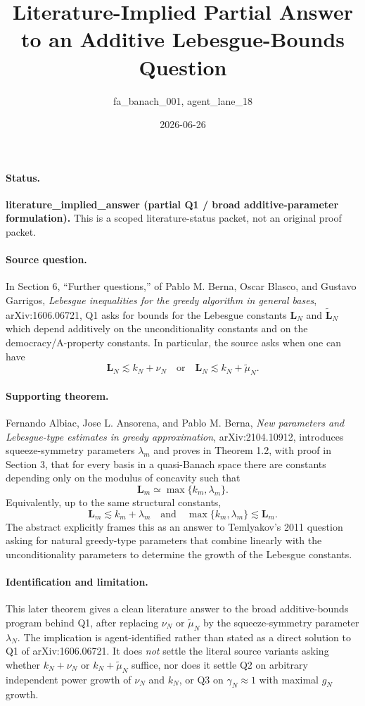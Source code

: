 \documentclass[11pt]{article}
\title{Literature-Implied Partial Answer to an Additive Lebesgue-Bounds Question}
\author{fa\_banach\_001, agent\_lane\_18}
\date{2026-06-26}
\begin{document}
\maketitle

\paragraph{Status.}
\textbf{literature\_implied\_answer (partial Q1 / broad additive-parameter formulation).}
This is a scoped literature-status packet, not an original proof packet.

\paragraph{Source question.}
In Section 6, ``Further questions,'' of Pablo M. Berna, Oscar Blasco, and Gustavo Garrigos,
\emph{Lebesgue inequalities for the greedy algorithm in general bases}, arXiv:1606.06721,
Q1 asks for bounds for the Lebesgue constants $\mathbf L_N$ and $\widetilde{\mathbf L}_N$
which depend additively on the unconditionality constants and on the democracy/A-property
constants.  In particular, the source asks when one can have
\[
  \mathbf L_N \lesssim k_N+\nu_N
  \quad\text{or}\quad
  \mathbf L_N \lesssim k_N+\widetilde\mu_N .
\]

\paragraph{Supporting theorem.}
Fernando Albiac, Jose L. Ansorena, and Pablo M. Berna,
\emph{New parameters and Lebesgue-type estimates in greedy approximation},
arXiv:2104.10912, introduces squeeze-symmetry parameters $\lambda_m$ and proves
in Theorem 1.2, with proof in Section 3, that for every basis in a quasi-Banach
space there are constants depending only on the modulus of concavity such that
\[
  \mathbf L_m \simeq \max\{k_m,\lambda_m\}.
\]
Equivalently, up to the same structural constants,
\[
  \mathbf L_m \lesssim k_m+\lambda_m
  \quad\text{and}\quad
  \max\{k_m,\lambda_m\}\lesssim \mathbf L_m .
\]
The abstract explicitly frames this as an answer to Temlyakov's 2011 question
asking for natural greedy-type parameters that combine linearly with the
unconditionality parameters to determine the growth of the Lebesgue constants.

\paragraph{Identification and limitation.}
This later theorem gives a clean literature answer to the broad additive-bounds
program behind Q1, after replacing $\nu_N$ or $\widetilde\mu_N$ by the squeeze-symmetry
parameter $\lambda_N$.  The implication is agent-identified rather than stated
as a direct solution to Q1 of arXiv:1606.06721.  It does \emph{not} settle the
literal source variants asking whether $k_N+\nu_N$ or $k_N+\widetilde\mu_N$
suffice, nor does it settle Q2 on arbitrary independent power growth of
$\nu_N$ and $k_N$, or Q3 on $\gamma_N\approx 1$ with maximal $g_N$ growth.
\end{document}
